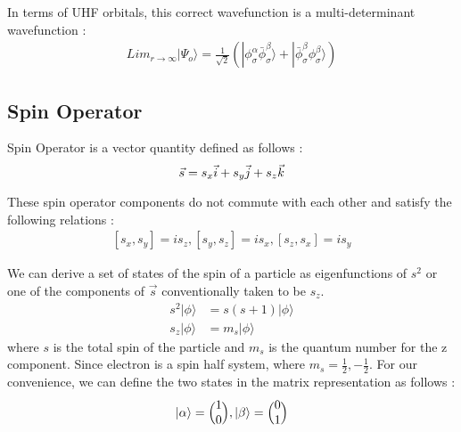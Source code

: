 \documentclass[11pt]{article}   	%
\begin{document}
	In terms of UHF orbitals, this correct  wavefunction is a multi-determinant wavefunction :\\
	\begin{equation}
	\begin{split}
		Lim_{r\rightarrow\infty}|\Psi_o\rangle=\frac{1}{\sqrt{2}}(|\phi_{\sigma}^{\alpha}\bar
		{\phi}_{\sigma}^{\beta}\rangle+|\bar{\phi}_{\sigma}^{\beta}\phi_{\sigma}^{\beta}\rangle)
	\end{split}
	\end{equation}
	
\subsection{Spin Operator}
	Spin Operator is a vector quantity defined as follows :
	\begin{equation}
		\vec{s}=s_x \vec{i}+s_y\vec{j} + s_z\vec{k}\\
	\end{equation}
	
	These spin operator components do not commute with each other and satisfy the following relations :
	\begin{equation}
	\begin{split}
		[s_x,s_y]=is_z,   
		[s_y,s_z]=is_x,   
		[s_z,s_x]=is_y
	\end{split}
	\end{equation}
	
	We can derive a set of states of the spin of a particle as eigenfunctions of $s^2$ or one of the components of $\vec{s}$ conventionally taken to be $s_z$. \\
	\begin{equation}
	\begin{split}	
		s^2|\phi\rangle&=s(s+1)|\phi\rangle\\
		s_z|\phi\rangle&=m_s|\phi\rangle
	\end{split}
	\end{equation}
	where $s$ is the total spin of the particle and $m_s$ is the quantum number for the z component. 
	Since electron is a spin half system, where $m_s=\frac{1}{2} , -\frac{1}{2}$. 
	For our convenience, we can define the two states in the matrix representation as follows :\\
	\begin{equation}
		|\alpha\rangle=\Big(\begin{matrix} 1\\ 0\end{matrix}\Big), 
		|\beta\rangle=\Big(\begin{matrix} 0\\ 1\end{matrix}\Big)\\
	\end{equation}
	
\end{document}
